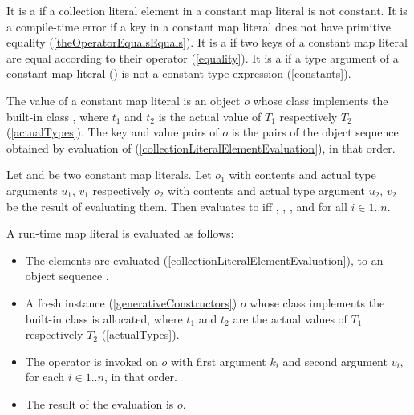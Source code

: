 \documentclass[makeidx]{article}
\begin{document}
{\LMHash{}%
It is a 
if a collection literal element in a constant map literal is not constant.
It is a compile-time error if
a key in a constant map literal
does not have primitive equality
(\ref{theOperatorEqualsEquals}).
It is a
 if two keys of a constant map literal are equal
according to their \lit{==} operator
(\ref{equality}).
It is a  if a type argument of a constant map literal
()
is not a constant type expression
(\ref{constants}).


\LMHash{}%
The value of a constant map literal
is an object $o$ whose class implements the built-in class
,
where $t_1$ and $t_2$ is the actual value of $T_1$ respectively $T_2$
(\ref{actualTypes}).
The key and value pairs of $o$ is
the pairs of the object sequence  obtained by
evaluation of 
(\ref{collectionLiteralElementEvaluation}),
in that order.

\LMHash{}%
Let 
and 
be two constant map literals.
Let $o_1$ with contents 
and actual type arguments $u_1$, $v_1$
respectively
$o_2$ with contents 
and actual type argument $u_2$, $v_2$
be the result of evaluating them.
Then  evaluates to \TRUE{} if{}f
, ,
, and
for all $i \in 1 .. n$.


\LMHash{}%
A run-time map literal
is evaluated as follows:
\begin{itemize}
\item
  The elements  are evaluated
  (\ref{collectionLiteralElementEvaluation}),
  to an object sequence .
\item
  A fresh instance (\ref{generativeConstructors}) $o$
  whose class implements the built-in class 
  is allocated,
  where $t_1$ and $t_2$ are the actual values of $T_1$ respectively $T_2$
  (\ref{actualTypes}).
\item
  The operator \lit{[]=} is invoked on $o$
  with first argument $k_i$ and second argument $v_i$,
  for each $i \in 1 .. n$, in that order.
\item
  The result of the evaluation is $o$.
\end{itemize}

}
\end{document}
